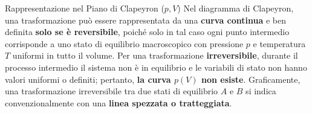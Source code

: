 \begin{osservazione}{Rappresentazione nel Piano di Clapeyron ($p, V$)}
Nel diagramma di Clapeyron, una trasformazione può essere rappresentata da una \textbf{curva continua} e ben definita \textbf{solo se è reversibile}, poiché solo in tal caso ogni punto intermedio corrisponde a uno stato di equilibrio macroscopico con pressione $p$ e temperatura $T$ uniformi in tutto il volume. 
Per una trasformazione \textbf{irreversibile}, durante il processo intermedio il sistema non è in equilibrio e le variabili di stato non hanno valori uniformi o definiti; pertanto, \textbf{la curva $p(V)$ non esiste}. Graficamente, una trasformazione irreversibile tra due stati di equilibrio $A$ e $B$ si indica convenzionalmente con una \textbf{linea spezzata o tratteggiata}.
\end{osservazione}

